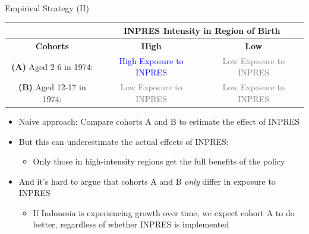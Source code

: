 \documentclass[11pt,notes=hide,aspectratio=169,mathserif]{beamer}
\begin{document}
\begin{frame}{Empirical Strategy (II)}
\begin{table}
\scriptsize
\centering
\begin{tabular}{|c|c|c|}
\hline
    & \multicolumn{2}{|c|}{\textbf{INPRES Intensity in Region of Birth}}  \\
    \hline
    \textbf{Cohorts} & \textbf{High} & \textbf{Low}  \\
\hline 
\textbf{(A)} Aged 2-6 in 1974:  & \rule{0pt}{15pt}  \textcolor{blue}{High Exposure to INPRES} & \rule{0pt}{15pt} \textcolor{gray}{Low Exposure to INPRES} \\
\hline
\textbf{(B)} Aged 12-17 in 1974:  & \rule{0pt}{15pt} \textcolor{gray}{Low Exposure to INPRES} & \rule{0pt}{15pt} \textcolor{gray}{Low Exposure to INPRES} \\
\hline
\end{tabular}
\end{table}

\begin{itemize}
    \item  Naive approach: Compare cohorts A and B to estimate the effect of INPRES
    \item  But this can underestimate the actual effects of INPRES:
    \begin{itemize}
        \item  Only those in high-intensity regions get the full benefits of the policy
    \end{itemize} 
    \item  And it's hard to argue that cohorts A and B \textit{only} differ in exposure to INPRES
    \begin{itemize}
        \item  If Indonesia is experiencing growth over time, we expect cohort A to do better, regardless of whether INPRES is implemented
    \end{itemize}
\end{itemize}
\end{frame}
\end{document}
